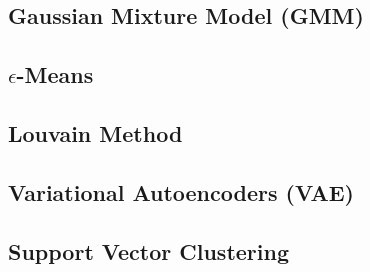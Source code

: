\subsection{Gaussian Mixture Model (GMM)}
\label{additional:unsupervised:GMM}

\subsection{\texorpdfstring{$\epsilon$}{epsilon}-Means}
\label{additional:unsupervised:epsilonMean}

\subsection{Louvain Method}
\label{additional:unsupervised:louvain}

\subsection{Variational Autoencoders (VAE)}
\label{additional:unsupervised:VAE}

\subsection{Support Vector Clustering}
\label{additional:unsupervised:SVC}

